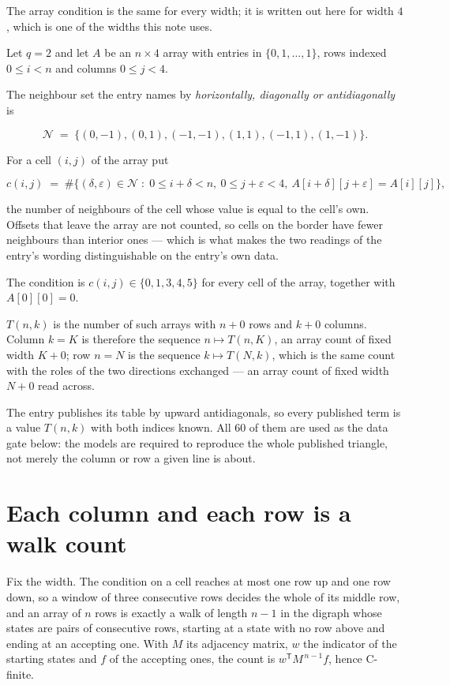 \documentclass[11pt]{article}
\theoremstyle{definition}
\begin{document}
The array condition is the same for every width; it is written out here for width $4$, which is one of the widths this note uses.

Let $q = 2$ and let $A$ be an $n \times 4$ array with entries in $\{0,1,\dots,1\}$, rows indexed $0 \le i < n$ and columns $0 \le j < 4$.

The neighbour set the entry names by {\itshape horizontally, diagonally or antidiagonally} is

\[\mathcal{N} \;=\; \{(0,-1), (0,1), (-1,-1), (1,1), (-1,1), (1,-1)\}.\]

For a cell $(i,j)$ of the array put

\[c(i,j) \;=\; \#\bigl\{(\delta,\varepsilon)\in\mathcal{N} \;:\; 0\le i+\delta<n,\ 0\le j+\varepsilon<4,\ A[i+\delta][j+\varepsilon] = A[i][j]\bigr\},\]

the number of neighbours of the cell whose value is equal to the cell's own. Offsets that leave the array are not counted, so cells on the border have fewer neighbours than interior ones --- which is what makes the two readings of the entry's wording distinguishable on the entry's own data.

The condition is $c(i,j) \in \{0, 1, 3, 4, 5\}$ for every cell of the array, together with $A[0][0]=0$.

$T(n,k)$ is the number of such arrays with $n + 0$ rows and $k + 0$ columns. Column $k = K$ is therefore the sequence $n \mapsto T(n,K)$, an array count of fixed width $K + 0$; row $n = N$ is the sequence $k \mapsto T(N,k)$, which is the same count with the roles of the two directions exchanged --- an array count of fixed width $N + 0$ read across.

The entry publishes its table by upward antidiagonals, so every published term is a value $T(n,k)$ with both indices known. All 60 of them are used as the data gate below: the models are required to reproduce the whole published triangle, not merely the column or row a given line is about.

\section{Each column and each row is a walk count}

Fix the width. The condition on a cell reaches at most one row up and one row down, so a window of three consecutive rows decides the whole of its middle row, and an array of $n$ rows is exactly a walk of length $n-1$ in the digraph whose states are pairs of consecutive rows, starting at a state with no row above and ending at an accepting one. With $M$ its adjacency matrix, $w$ the indicator of the starting states and $f$ of the accepting ones, the count is $w^{\mathsf T}M^{\,n-1}f$, hence C-finite.
\end{document}
